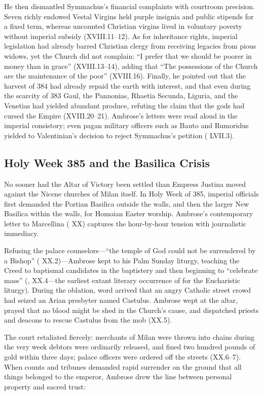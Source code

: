He then dismantled Symmachus's financial complaints with courtroom precision. Seven richly endowed Vestal Virgins held purple insignia and public stipends for a fixed term, whereas uncounted Christian virgins lived in voluntary poverty without imperial subsidy (XVIII.11--12). As for inheritance rights, imperial legislation had already barred Christian clergy from receiving legacies from pious widows, yet the Church did not complain: ``I prefer that we should be poorer in money than in grace'' (XVIII.13--14), adding that ``The possessions of the Church are the maintenance of the poor'' (XVIII.16). Finally, he pointed out that the harvest of 384 had already repaid the earth with interest, and that even during the scarcity of 383 Gaul, the Pannonias, Rhaetia Secunda, Liguria, and the Venetias had yielded abundant produce, refuting the claim that the gods had cursed the Empire (XVIII.20--21). Ambrose's letters were read aloud in the imperial consistory; even pagan military officers such as Bauto and Rumoridus yielded to Valentinian's decision to reject Symmachus's petition ( LVII.3).

\subsection{Holy Week 385 and the Basilica Crisis}

No sooner had the Altar of Victory been settled than Empress Justina moved against the Nicene churches of Milan itself. In Holy Week of 385, imperial officials first demanded the Portian Basilica outside the walls, and then the larger New Basilica within the walls, for Homoian Easter worship. Ambrose's contemporary letter to Marcellina ( XX) captures the hour-by-hour tension with journalistic immediacy.

Refusing the palace counselors---``the temple of God could not be surrendered by a Bishop'' ( XX.2)---Ambrose kept to his Palm Sunday liturgy, teaching the Creed to baptismal candidates in the baptistery and then beginning to ``celebrate mass'' (, XX.4---the earliest extant literary occurrence of  for the Eucharistic liturgy). During the oblation, word arrived that an angry Catholic street crowd had seized an Arian presbyter named Castulus. Ambrose wept at the altar, prayed that no blood might be shed in the Church's cause, and dispatched priests and deacons to rescue Castulus from the mob (XX.5).

The court retaliated fiercely: merchants of Milan were thrown into chains during the very week debtors were ordinarily released, and fined two hundred pounds of gold within three days; palace officers were ordered off the streets (XX.6--7). When counts and tribunes demanded rapid surrender on the ground that all things belonged to the emperor, Ambrose drew the line between personal property and sacred trust:

